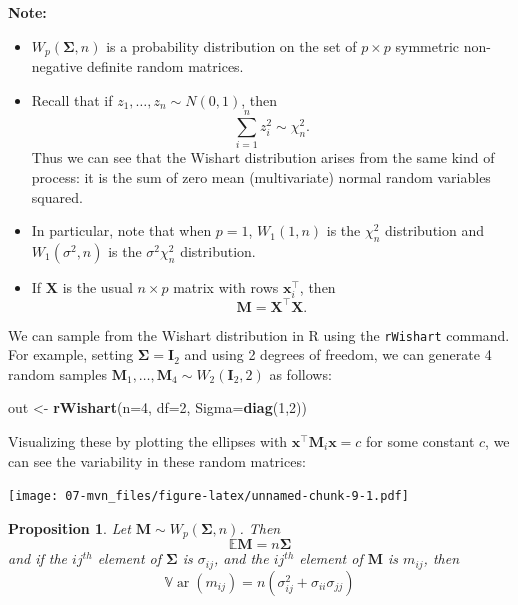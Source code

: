 \documentclass[
]{book}
\newenvironment{Shaded}{\begin{snugshade}}{\end{snugshade}}
\newcommand{\AttributeTok}[1]{\textcolor[rgb]{0.13,0.29,0.53}{#1}}
\newcommand{\DecValTok}[1]{\textcolor[rgb]{0.00,0.00,0.81}{#1}}
\newcommand{\FunctionTok}[1]{\textcolor[rgb]{0.13,0.29,0.53}{\textbf{#1}}}
\newcommand{\NormalTok}[1]{#1}
\newcommand{\OtherTok}[1]{\textcolor[rgb]{0.56,0.35,0.01}{#1}}
\newtheorem{proposition}{Proposition}[chapter]
\theoremstyle{definition}
\theoremstyle{definition}
\theoremstyle{definition}
\theoremstyle{definition}
\theoremstyle{remark}
\begin{document}
\textbf{Note:}

\begin{itemize}
\item
  \(W_p(\boldsymbol{\Sigma},n)\) is a probability distribution on the set of \(p \times p\) symmetric non-negative definite random matrices.
\item
  Recall that if \(z_1, \ldots, z_n \sim N(0, 1)\), then
  \[\sum_{i=1}^n z_i^2 \sim \chi^2_n.\]
  Thus we can see that the Wishart distribution arises from the same kind of process: it is the sum of zero mean (multivariate) normal random variables squared.
\item
  In particular, note that
  when \(p=1\), \(W_1(1,n)\) is the \(\chi_n^2\) distribution and \(W_1(\sigma^2,n)\) is the \(\sigma^2 \chi_n^2\) distribution.
\item
  If \(\mathbf X\) is the usual \(n \times p\) matrix with rows \(\mathbf x_i^\top\), then
  \[\mathbf M= \mathbf X^\top \mathbf X.\]
\end{itemize}

We can sample from the Wishart distribution in R using the \texttt{rWishart} command. For example, setting \(\boldsymbol{\Sigma}=\mathbf I_2\) and using 2 degrees of freedom, we can generate 4 random samples \(\mathbf M_1, \ldots, \mathbf M_4 \sim W_2(\mathbf I_2, 2)\) as follows:

\begin{Shaded}
\begin{Highlighting}[]
\NormalTok{out }\OtherTok{\textless{}{-}} \FunctionTok{rWishart}\NormalTok{(}\AttributeTok{n=}\DecValTok{4}\NormalTok{, }\AttributeTok{df=}\DecValTok{2}\NormalTok{, }\AttributeTok{Sigma=}\FunctionTok{diag}\NormalTok{(}\DecValTok{1}\NormalTok{,}\DecValTok{2}\NormalTok{))}
\end{Highlighting}
\end{Shaded}

Visualizing these by plotting the ellipses with \(\mathbf x^\top \mathbf M_i \mathbf x=c\) for some constant \(c\), we can see the variability in these random matrices:

\texttt{[image: 07-mvn\_files/figure-latex/unnamed-chunk-9-1.pdf]}

\begin{proposition}
\protect\hypertarget{prp:wishartmean}{}\label{prp:wishartmean}Let \(\mathbf M\sim W_p(\boldsymbol{\Sigma}, n)\). Then
\[{\mathbb{E}}\mathbf M= n \boldsymbol{\Sigma}\]
and if the \(ij^{th}\) element of \(\boldsymbol{\Sigma}\) is \(\sigma_{ij}\), and the \(ij^{th}\) element of \(\mathbf M\) is \(m_{ij}\), then
\[{\mathbb{V}\operatorname{ar}}(m_{ij}) =  n \left(\sigma_{ij}^2+\sigma_{ii}\sigma_{jj} \right)\]
\end{proposition}
\end{document}
